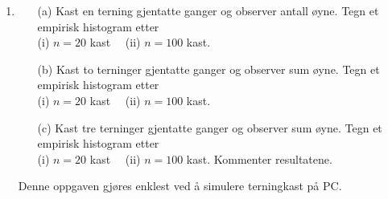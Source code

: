 \begin{enumerate}
\item
    \begin{itemize}
     \item[(a)]  Kast en terning gjentatte ganger og observer antall
      øyne. Tegn et empirisk histogram etter \\
          (i) $n=20$ kast \ \  (ii) $n=100$ kast.
     \item[(b)]  Kast to terninger gjentatte ganger og observer sum
          øyne. Tegn et empirisk histogram etter \\
          (i) $n=20$ kast \ \  (ii) $n=100$ kast.
     \item[(c)]  Kast tre terninger gjentatte ganger og observer sum
          øyne. Tegn et empirisk histogram etter\\
          (i) $n=20$ kast \ \  (ii) $n=100$ kast.
     Kommenter resultatene.
     \end{itemize}
     Denne oppgaven gjøres enklest ved å simulere terningkast på PC.
\end{enumerate}

\normalsize


